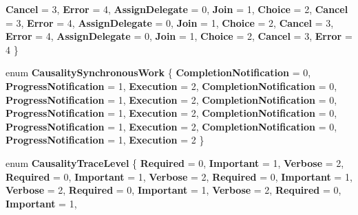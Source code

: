\begin{DoxyCompactItemize}
\newline
{\bfseries Cancel} = 3, 
{\bfseries Error} = 4, 
{\bfseries Assign\+Delegate} = 0, 
{\bfseries Join} = 1, 
\newline
{\bfseries Choice} = 2, 
{\bfseries Cancel} = 3, 
{\bfseries Error} = 4, 
{\bfseries Assign\+Delegate} = 0, 
\newline
{\bfseries Join} = 1, 
{\bfseries Choice} = 2, 
{\bfseries Cancel} = 3, 
{\bfseries Error} = 4, 
\newline
{\bfseries Assign\+Delegate} = 0, 
{\bfseries Join} = 1, 
{\bfseries Choice} = 2, 
{\bfseries Cancel} = 3, 
\newline
{\bfseries Error} = 4
 \}
\item 
\mbox{\label{namespace_windows_1_1_foundation_1_1_diagnostics_a63986dc9acde6ceb9a128207a5bd1e56}} 
enum {\bfseries Causality\+Synchronous\+Work} \{ \newline
{\bfseries Completion\+Notification} = 0, 
{\bfseries Progress\+Notification} = 1, 
{\bfseries Execution} = 2, 
{\bfseries Completion\+Notification} = 0, 
\newline
{\bfseries Progress\+Notification} = 1, 
{\bfseries Execution} = 2, 
{\bfseries Completion\+Notification} = 0, 
{\bfseries Progress\+Notification} = 1, 
\newline
{\bfseries Execution} = 2, 
{\bfseries Completion\+Notification} = 0, 
{\bfseries Progress\+Notification} = 1, 
{\bfseries Execution} = 2, 
\newline
{\bfseries Completion\+Notification} = 0, 
{\bfseries Progress\+Notification} = 1, 
{\bfseries Execution} = 2
 \}
\item 
\mbox{\label{namespace_windows_1_1_foundation_1_1_diagnostics_aa82022f66e6c5b053464b95c6479f156}} 
enum {\bfseries Causality\+Trace\+Level} \{ \newline
{\bfseries Required} = 0, 
{\bfseries Important} = 1, 
{\bfseries Verbose} = 2, 
{\bfseries Required} = 0, 
\newline
{\bfseries Important} = 1, 
{\bfseries Verbose} = 2, 
{\bfseries Required} = 0, 
{\bfseries Important} = 1, 
\newline
{\bfseries Verbose} = 2, 
{\bfseries Required} = 0, 
{\bfseries Important} = 1, 
{\bfseries Verbose} = 2, 
\newline
{\bfseries Required} = 0, 
{\bfseries Important} = 1, 

\end{DoxyCompactItemize}
